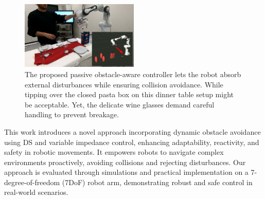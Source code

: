 \begin{figure}
\centerline{\includegraphics[width=0.5\textwidth]{figures/robot_arm_table_avoidance}}
\caption{
The proposed passive obstacle-aware controller lets the robot absorb external disturbances while ensuring collision avoidance. 
While tipping over the closed pasta box on this dinner table setup might be acceptable. Yet, the delicate wine glasses demand careful handling to prevent breakage.
}
\label{fig:table_avoidance_with_obstacle}
\end{figure}

This work introduces a novel approach incorporating dynamic obstacle avoidance using DS and variable impedance control, enhancing adaptability, reactivity, and safety in robotic movements. It empowers robots to navigate complex environments proactively, avoiding collisions and rejecting disturbances. Our approach is evaluated through simulations and practical implementation on a 7-degree-of-freedom (7DoF) robot arm, demonstrating robust and safe control in real-world scenarios.

